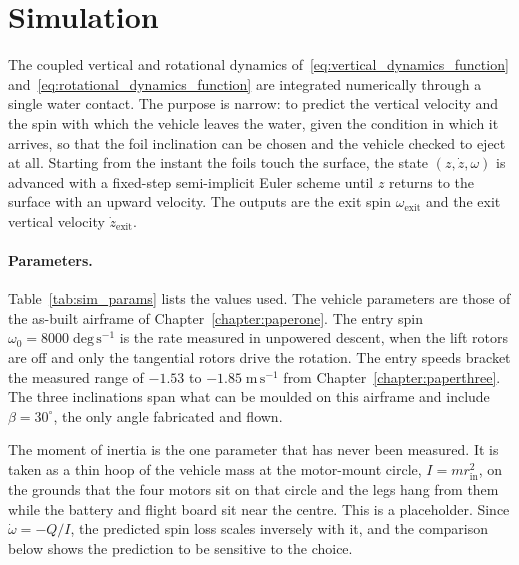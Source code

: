 \section{Simulation}
\label{sec:simulation}

The coupled vertical and rotational dynamics
of~\eqref{eq:vertical_dynamics_function}
and~\eqref{eq:rotational_dynamics_function} are integrated numerically through
a single water contact.  The purpose is narrow: to predict the vertical
velocity and the spin with which the vehicle leaves the water, given the
condition in which it arrives, so that the foil inclination can be chosen and
the vehicle checked to eject at all.  Starting from the instant the foils touch
the surface, the state $(z,\dot{z},\omega)$ is advanced with a fixed-step
semi-implicit Euler scheme until $z$ returns to the surface with an upward
velocity.  The outputs are the exit spin $\omega_{\mathrm{exit}}$ and the exit
vertical velocity $\dot{z}_{\mathrm{exit}}$.

\paragraph{Parameters.}
Table~\ref{tab:sim_params} lists the values used.  The vehicle parameters are
those of the as-built airframe of Chapter~\ref{chapter:paperone}.  The entry
spin $\omega_0 = 8000\;\mathrm{deg\,s^{-1}}$ is the rate measured in
unpowered descent, when the lift rotors are off and only the tangential rotors
drive the rotation.  The entry speeds bracket the measured range of $-1.53$ to
$-1.85\;\mathrm{m\,s^{-1}}$ from Chapter~\ref{chapter:paperthree}.  The three
inclinations span what can be moulded on this airframe and include
$\beta = 30^\circ$, the only angle fabricated and flown.

The moment of inertia is the one parameter that has never been measured.  It is
taken as a thin hoop of the vehicle mass at the motor-mount circle,
$I = m r_{\mathrm{in}}^{2}$, on the grounds that the four motors sit on that
circle and the legs hang from them while the battery and flight board sit near
the centre.  This is a placeholder.  Since $\dot{\omega} = -Q/I$, the predicted
spin loss scales inversely with it, and the comparison below shows the
prediction to be sensitive to the choice.

